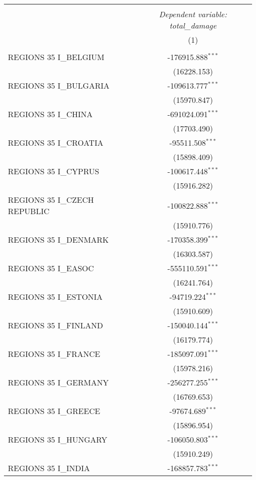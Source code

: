 \begin{table}[!htbp] \centering
\begin{tabular}{@{\extracolsep{5pt}}lc}
\\[-1.8ex]\hline
\hline \\[-1.8ex]
& \multicolumn{1}{c}{\textit{Dependent variable: total_damage}} \
\cr \cline{2-2}
\\[-1.8ex] & (1) \\
\hline \\[-1.8ex]
 REGIONS 35 I_BELGIUM & -176915.888$^{***}$ \\
& (16228.153) \\
 REGIONS 35 I_BULGARIA & -109613.777$^{***}$ \\
& (15970.847) \\
 REGIONS 35 I_CHINA & -691024.091$^{***}$ \\
& (17703.490) \\
 REGIONS 35 I_CROATIA & -95511.508$^{***}$ \\
& (15898.409) \\
 REGIONS 35 I_CYPRUS & -100617.448$^{***}$ \\
& (15916.282) \\
 REGIONS 35 I_CZECH REPUBLIC & -100822.888$^{***}$ \\
& (15910.776) \\
 REGIONS 35 I_DENMARK & -170358.399$^{***}$ \\
& (16303.587) \\
 REGIONS 35 I_EASOC & -555110.591$^{***}$ \\
& (16241.764) \\
 REGIONS 35 I_ESTONIA & -94719.224$^{***}$ \\
& (15910.609) \\
 REGIONS 35 I_FINLAND & -150040.144$^{***}$ \\
& (16179.774) \\
 REGIONS 35 I_FRANCE & -185097.091$^{***}$ \\
& (15978.216) \\
 REGIONS 35 I_GERMANY & -256277.255$^{***}$ \\
& (16769.653) \\
 REGIONS 35 I_GREECE & -97674.689$^{***}$ \\
& (15896.954) \\
 REGIONS 35 I_HUNGARY & -106050.803$^{***}$ \\
& (15910.249) \\
 REGIONS 35 I_INDIA & -168857.783$^{***}$ \\

\end{tabular}
\end{table}
